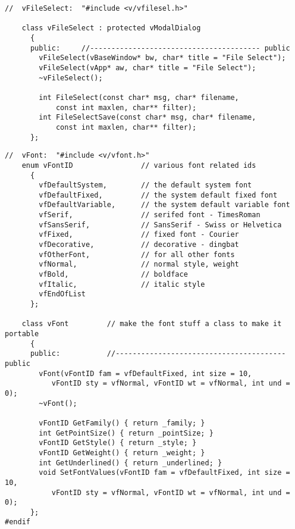 \footnotesize
\begin{verbatim}
//  vFileSelect:  "#include <v/vfilesel.h>"

    class vFileSelect : protected vModalDialog
      {
      public:     //---------------------------------------- public
        vFileSelect(vBaseWindow* bw, char* title = "File Select");
        vFileSelect(vApp* aw, char* title = "File Select");
        ~vFileSelect();

        int FileSelect(const char* msg, char* filename, 
            const int maxlen, char** filter);
        int FileSelectSave(const char* msg, char* filename, 
            const int maxlen, char** filter);
      };
\end{verbatim}
\normalfont\normalsize


\footnotesize
\begin{verbatim}
//  vFont:  "#include <v/vfont.h>"
    enum vFontID                // various font related ids
      {
        vfDefaultSystem,        // the default system font
        vfDefaultFixed,         // the system default fixed font
        vfDefaultVariable,      // the system default variable font
        vfSerif,                // serifed font - TimesRoman
        vfSansSerif,            // SansSerif - Swiss or Helvetica
        vfFixed,                // fixed font - Courier
        vfDecorative,           // decorative - dingbat
        vfOtherFont,            // for all other fonts
        vfNormal,               // normal style, weight
        vfBold,                 // boldface
        vfItalic,               // italic style
        vfEndOfList
      };

    class vFont         // make the font stuff a class to make it portable
      {
      public:           //---------------------------------------- public
        vFont(vFontID fam = vfDefaultFixed, int size = 10,
           vFontID sty = vfNormal, vFontID wt = vfNormal, int und = 0);
        ~vFont();

        vFontID GetFamily() { return _family; }
        int GetPointSize() { return _pointSize; }
        vFontID GetStyle() { return _style; }
        vFontID GetWeight() { return _weight; }
        int GetUnderlined() { return _underlined; }
        void SetFontValues(vFontID fam = vfDefaultFixed, int size = 10,
           vFontID sty = vfNormal, vFontID wt = vfNormal, int und = 0);
      };
#endif
\end{verbatim}
\normalfont\normalsize


